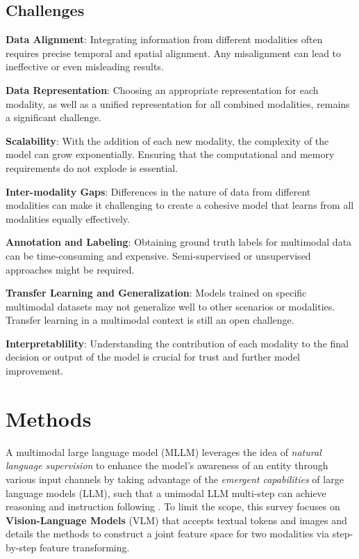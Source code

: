 \documentclass[11pt]{article}
\begin{document}
\subsection{Challenges}
\begin{enumerate}
    \noindent \textbf{Data Alignment}: Integrating information from different modalities often requires precise temporal and spatial alignment. Any misalignment can lead to ineffective or even misleading results.
    
    \noindent \textbf{Data Representation}: Choosing an appropriate representation for each modality, as well as a unified representation for all combined modalities, remains a significant challenge. 
    
    \noindent \textbf{Scalability}: With the addition of each new modality, the complexity of the model can grow exponentially. Ensuring that the computational and memory requirements do not explode is essential.
    
    \noindent \textbf{Inter-modality Gaps}: Differences in the nature of data from different modalities can make it challenging to create a cohesive model that learns from all modalities equally effectively.
    
    \noindent \textbf{Annotation and Labeling}: Obtaining ground truth labels for multimodal data can be time-consuming and expensive. Semi-supervised or unsupervised approaches might be required.
    
    \noindent \textbf{Transfer Learning and Generalization}: Models trained on specific multimodal datasets may not generalize well to other scenarios or modalities. Transfer learning in a multimodal context is still an open challenge.
    
    \noindent \textbf{Interpretablility}: Understanding the contribution of each modality to the final decision or output of the model is crucial for trust and further model improvement.\cite{9361559}
\end{enumerate}


\section{Methods}
A multimodal large language model (MLLM) leverages the idea of \textit{natural language supervision} \citep{DBLP:conf/icml/RadfordKHRGASAM21} to enhance the model's awareness of an entity through various input channels by taking advantage of the \textit{emergent capabilities} \citep{DBLP:journals/tmlr/WeiTBRZBYBZMCHVLDF22} of  large language models (LLM), such that a unimodal LLM multi-step can achieve reasoning \citep{DBLP:journals/corr/abs-2112-11446} and instruction following \citep{DBLP:conf/nips/Ouyang0JAWMZASR22}. To limit the scope, this survey focuses on \textbf{Vision-Language Models} (VLM) that accepts textual tokens and images and details the methods to construct a joint feature space for two modalities via step-by-step feature transforming. 
\end{document}
